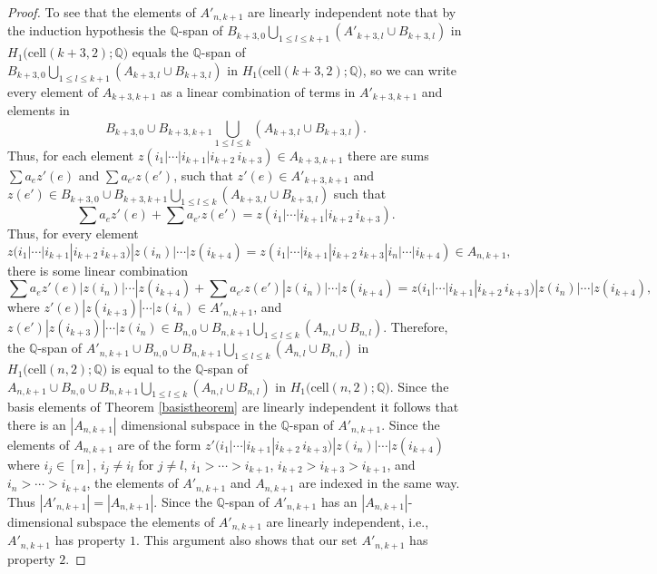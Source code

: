 \documentclass[12py]{amsart}%
\theoremstyle{definition}\newtheorem{definition}[thm]{Definition}
\theoremstyle{definition}
\newcommand{\Q}{\ensuremath{\mathbb{Q}}}
\begin{document}
\begin{proof}
To see that the elements of $A'_{n,k+1}$ are linearly independent note that by the induction hypothesis the $\Q$-span of $B_{k+3,0}\bigcup_{1\le l\le k+1}(A'_{k+3,l}\cup B_{k+3,l})$ in $H_{1}\big(\text{cell}(k+3, 2);\Q\big)$ equals the $\Q$-span of $B_{k+3,0}\bigcup_{1\le l\le k+1}(A_{k+3,l}\cup B_{k+3,l})$ in $H_{1}\big(\text{cell}(k+3, 2);\Q\big)$, so we can write every element of $A_{k+3,k+1}$ as a linear combination of terms in $A'_{k+3,k+1}$ and elements in 
\[
B_{k+3,0}\cup B_{k+3,k+1}\bigcup_{1\le l\le k}\left(A_{k+3,l}\cup B_{k+3,l}\right).
\] 
Thus, for each element $z(i_{1}|\cdots|i_{k+1}|i_{k+2}\,i_{k+3})\in A_{k+3,k+1}$ there are sums $\sum a_{e}z'(e)$ and $\sum a_{e'}z(e')$, such that $z'(e)\in A'_{k+3,k+1}$ and $z(e')\in B_{k+3,0}\cup B_{k+3,k+1}\bigcup_{1\le l\le k}\left(A_{k+3,l}\cup B_{k+3,l}\right)$ such that
\[
\sum a_{e}z'(e)+\sum a_{e'}z(e')=z(i_{1}|\cdots|i_{k+1}|i_{k+2}\,i_{k+3}).
\]
Thus, for every element
 \[
z(i_{1}|\cdots|i_{k+1}|i_{k+2}\,i_{k+3})|z(i_{n})|\cdots|z(i_{k+4})=z(i_{1}|\cdots|i_{k+1}|i_{k+2}\,i_{k+3}|i_{n}|\cdots|i_{k+4})\in A_{n,k+1},
\]
there is some linear combination
\[
\sum a_{e}z'(e)|z(i_{n})|\cdots|z(i_{k+4})+\sum a_{e'}z(e')|z(i_{n})|\cdots|z(i_{k+4})=z(i_{1}|\cdots|i_{k+1}|i_{k+2}\,i_{k+3})|z(i_{n})|\cdots|z(i_{k+4}),
\]
where $z'(e)|z(i_{k+3})|\cdots|z(i_{n})\in A'_{n,k+1}$, and $z(e')|z(i_{k+3})|\cdots|z(i_{n})\in B_{n,0}\cup B_{n,k+1}\bigcup_{1\le l\le k}\left(A_{n,l}\cup B_{n,l}\right)$. Therefore, the $\Q$-span of $A'_{n,k+1}\cup B_{n,0}\cup B_{n,k+1}\bigcup_{1\le l\le k}(A_{n,l}\cup B_{n,l})$  in $H_{1}\big(\text{cell}(n, 2);\Q\big)$ is equal to the $\Q$-span of $A_{n,k+1}\cup B_{n,0}\cup B_{n,k+1}\bigcup_{1\le l\le k}(A_{n,l}\cup B_{n,l})$ in $H_{1}\big(\text{cell}(n, 2);\Q\big)$. Since the basis elements of Theorem \ref{basistheorem} are linearly independent it follows that there is an $|A_{n,k+1}|$ dimensional subspace in the $\Q$-span of $A'_{n,k+1}$. Since the elements of $A_{n,k+1}$ are of the form $z'(i_{1}|\cdots|i_{k+1}|i_{k+2}\,i_{k+3})|z(i_{n})|\cdots|z(i_{k+4})$ where $i_{j}\in [n]$, $i_{j}\neq i_{l}$ for $j\neq l$, $i_{1}>\cdots>i_{k+1}$, $i_{k+2}>i_{k+3}>i_{k+1}$, and $i_{n}>\cdots>i_{k+4}$, the elements of $A'_{n,k+1}$ and $A_{n,k+1}$ are indexed in the same way. Thus $|A'_{n,k+1}|=|A_{n,k+1}|$. Since the $\Q$-span of $A'_{n,k+1}$ has an $|A_{n,k+1}|$-dimensional subspace the elements of $A'_{n,k+1}$ are linearly independent, i.e., $A'_{n,k+1}$ has property $1$. This argument also shows that our set $A'_{n,k+1}$ has property $2$. 


\end{proof}
\end{document}
